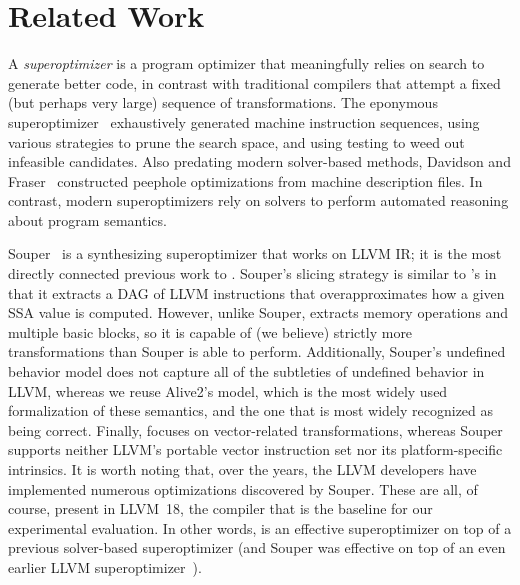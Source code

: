 \section{Related Work}

A \emph{superoptimizer} is a program optimizer that meaningfully
relies on search to generate better code, in contrast with traditional
compilers that attempt a fixed (but perhaps very large) sequence of
transformations.
%
The eponymous superoptimizer~\cite{massalin} exhaustively generated
machine instruction sequences, using various strategies to prune the
search space, and using testing to weed out infeasible candidates.
%
Also predating modern solver-based methods, Davidson and Fraser~\cite{peep84}
constructed peephole optimizations from machine description files.
%
In contrast, modern superoptimizers rely on solvers to perform
automated reasoning about program semantics.


Souper~\cite{souper} is a synthesizing superoptimizer that works on
LLVM IR; it is the most directly connected previous work to \minotaur{}.
%
Souper's slicing strategy is similar to \minotaur's in that it extracts a
DAG of LLVM instructions that overapproximates how a given SSA value
is computed.
%
However, unlike Souper, \minotaur{} extracts memory operations and
multiple basic blocks, so it is capable of (we believe) strictly more
transformations than Souper is able to perform.
%
Additionally, Souper's undefined behavior model does not capture all
of the subtleties of undefined behavior in LLVM, whereas we reuse
Alive2's model, which is the most widely used formalization of these
semantics, and the one that is most widely recognized as being
correct.
%
Finally, \minotaur{} focuses on vector-related transformations, whereas
Souper supports neither LLVM's portable vector instruction set nor its
platform-specific intrinsics.
%
It is worth noting that, over the years, the LLVM developers have
implemented numerous optimizations discovered by Souper.
%
These are all, of course, present in LLVM~18, the compiler that is the
baseline for our experimental evaluation.
%
In other words, \minotaur{} is an effective superoptimizer on top of a
previous solver-based superoptimizer (and Souper was effective on top
of an even earlier LLVM superoptimizer~\cite{Sands11}).


